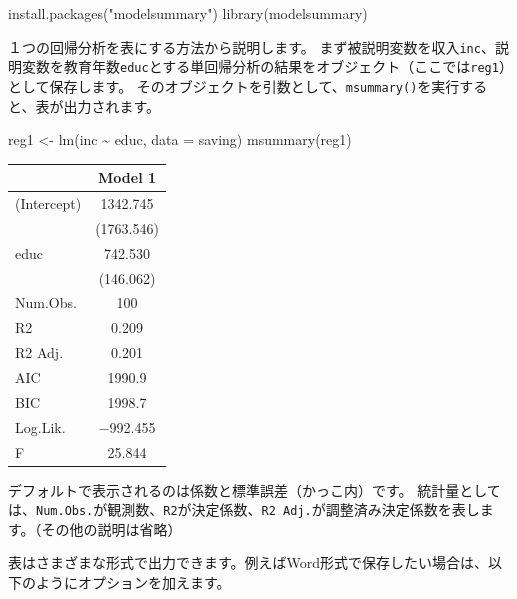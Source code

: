 \documentclass[
]{book}
\newenvironment{Shaded}{\begin{snugshade}}{\end{snugshade}}
\newcommand{\AttributeTok}[1]{\textcolor[rgb]{0.77,0.63,0.00}{#1}}
\newcommand{\FunctionTok}[1]{\textcolor[rgb]{0.00,0.00,0.00}{#1}}
\newcommand{\NormalTok}[1]{#1}
\newcommand{\OtherTok}[1]{\textcolor[rgb]{0.56,0.35,0.01}{#1}}
\newcommand{\SpecialCharTok}[1]{\textcolor[rgb]{0.00,0.00,0.00}{#1}}
\newcommand{\StringTok}[1]{\textcolor[rgb]{0.31,0.60,0.02}{#1}}
\begin{document}
\begin{Shaded}
\begin{Highlighting}[]
\FunctionTok{install.packages}\NormalTok{(}\StringTok{"modelsummary"}\NormalTok{)}
\FunctionTok{library}\NormalTok{(modelsummary)}
\end{Highlighting}
\end{Shaded}

１つの回帰分析を表にする方法から説明します。
まず被説明変数を収入\texttt{inc}、説明変数を教育年数\texttt{educ}とする単回帰分析の結果をオブジェクト（ここでは\texttt{reg1}）として保存します。
そのオブジェクトを引数として、\texttt{msummary()}を実行すると、表が出力されます。

\begin{Shaded}
\begin{Highlighting}[]
\NormalTok{reg1 }\OtherTok{\textless{}{-}} \FunctionTok{lm}\NormalTok{(inc }\SpecialCharTok{\textasciitilde{}}\NormalTok{ educ, }\AttributeTok{data =}\NormalTok{ saving)}
\FunctionTok{msummary}\NormalTok{(reg1)}
\end{Highlighting}
\end{Shaded}

\begin{table}
\centering
\begin{tabular}[t]{lc}
\toprule
  & Model 1\\
\midrule
(Intercept) & \num{1342.745}\\
 & (\num{1763.546})\\
educ & \num{742.530}\\
 & (\num{146.062})\\
\midrule
Num.Obs. & \num{100}\\
R2 & \num{0.209}\\
R2 Adj. & \num{0.201}\\
AIC & \num{1990.9}\\
BIC & \num{1998.7}\\
Log.Lik. & \num{-992.455}\\
F & \num{25.844}\\
\bottomrule
\end{tabular}
\end{table}

デフォルトで表示されるのは係数と標準誤差（かっこ内）です。
統計量としては、\texttt{Num.Obs.}が観測数、\texttt{R2}が決定係数、\texttt{R2\ Adj.}が調整済み決定係数を表します。（その他の説明は省略）

表はさまざまな形式で出力できます。例えばWord形式で保存したい場合は、以下のようにオプションを加えます。
\end{document}
